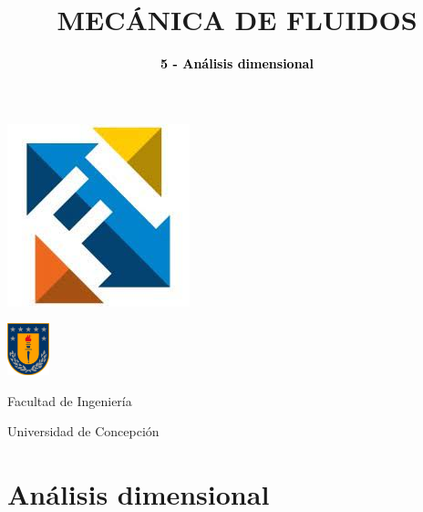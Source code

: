 \documentclass[t]{beamer}
\begin{document}
\begin{frame}[plain]

\vspace{0.5cm}
\begin{minipage}{0.1\linewidth}
{\flushleft\includegraphics[height=1.5
cm]{FI} }
\end{minipage}\hfill
\centering\begin{minipage}{0.55\linewidth}
\end{minipage}\hfill
\begin{minipage}{0.2\linewidth}
\flushright
\includegraphics[height=1.5cm]{udec}
\end{minipage}
\vspace{-1.5cm}

\centering\scriptsize{Facultad de Ingenier\'ia}

\centering\scriptsize{Universidad de Concepci\'on}


\title[\today]{{\textbf{\huge{MEC\'ANICA DE FLUIDOS}}}}

\subtitle[\today]{\textbf{\textcolor{black}{5 - Análisis dimensional}}}

\maketitle


\end{frame}




\section{Análisis dimensional}
\end{document}
